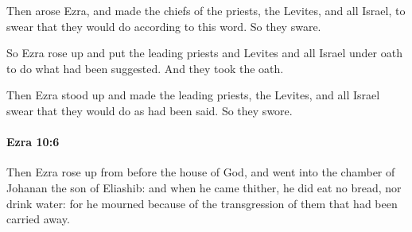 			\begin{versebox}
					\item[BHS] 
					\item[LXX] 
					\item[ASV] Then arose Ezra, and made the chiefs of the priests, the Levites, and all Israel, to swear that they would do according to this word. So they sware.
					\item[NIV] So Ezra rose up and put the leading priests and Levites and all Israel under oath to do what had been suggested. And they took the oath.
					\item[NRSV] Then Ezra stood up and made the leading priests, the Levites, and all Israel swear that they would do as had been said. So they swore.
			\end{versebox}

		\paragraph{Ezra 10:6} %
			\label{EZRA-10-6}

			Then Ezra rose up from before the house of God, and went into the chamber of Johanan the son of Eliashib: and when he came thither, he did eat no bread, nor drink water: for he mourned because of the transgression of them that had been carried away.

